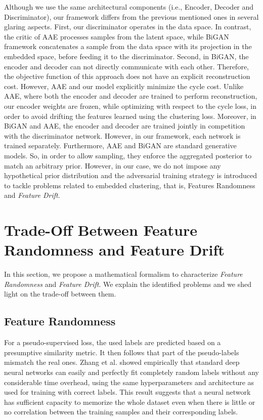 \documentclass{article}
\begin{document}
Although we use the same architectural components (i.e., Encoder, Decoder and Discriminator), our framework differs from the previous mentioned ones in several glaring aspects. First, our discriminator operates in the data space. In contrast, the critic of AAE processes samples from the latent space, while BiGAN framework concatenates a sample from the data space with its projection in the embedded space, before feeding it to the discriminator. Second, in BiGAN, the encoder and decoder can not directly communicate with each other. Therefore, the objective function of this approach does not have an explicit reconstruction cost. However, AAE and our model explicitly minimize the cycle cost. Unlike AAE, where both the encoder and decoder are trained to perform reconstruction, our encoder weights are frozen, while optimizing with respect to the cycle loss, in order to avoid drifting the features learned using the clustering loss. Moreover, in BiGAN and AAE, the encoder and decoder are trained jointly in competition with the discriminator network. However, in our framework, each network is trained separately. Furthermore, AAE and BiGAN are standard generative models. So, in order to allow sampling, they enforce the aggregated posterior to match an arbitrary prior. However, in our case, we do not impose any hypothetical prior distribution and the adversarial training strategy is introduced to tackle problems related to embedded clustering, that is, Features Randomness and \textit{Feature Drift}.

\section{Trade-Off Between Feature Randomness and Feature Drift}
In this section, we propose a mathematical formalism to characterize \textit{Feature Randomness} and \textit{Feature Drift}. We explain the identified problems and we shed light on the trade-off between them.

\subsection{Feature Randomness}
For a pseudo-supervised loss, the used labels are predicted based on a presumptive similarity metric. It then follows that part of the pseudo-labels mismatch the real ones. Zhang et al. \cite{paper66} showed empirically that standard deep neural networks can easily and perfectly fit completely random labels without any considerable time overhead, using the same hyperparameters and architecture as used for training with correct labels. This result suggests that a neural network has sufficient capacity to memorize the whole dataset even when there is little or no correlation between the training samples and their corresponding labels.
\end{document}
